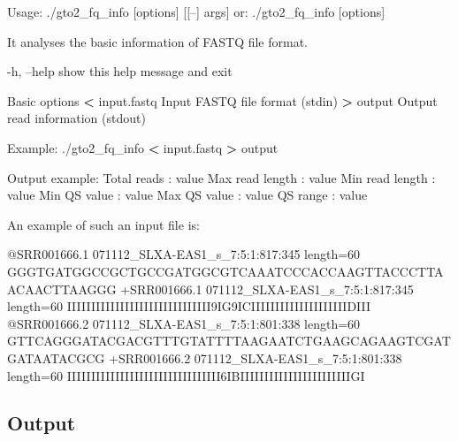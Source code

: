 \documentclass[11pt,]{krantz}
\newenvironment{Shaded}{\begin{snugshade}}{\end{snugshade}}
\newcommand{\OperatorTok}[1]{\textcolor[rgb]{0.43,0.43,0.43}{\textbf{#1}}}
\newcommand{\ExtensionTok}[1]{#1}
\newcommand{\NormalTok}[1]{#1}
\begin{document}
\begin{Shaded}
\begin{Highlighting}[]
\ExtensionTok{Usage}\NormalTok{: ./gto2_fq_info [options] [[--] args]}
   \ExtensionTok{or}\NormalTok{: ./gto2_fq_info [options]}

\ExtensionTok{It}\NormalTok{ analyses the basic information of FASTQ file format.}

    \ExtensionTok{-h}\NormalTok{, --help            show this help message and exit}

\ExtensionTok{Basic}\NormalTok{ options}
    \OperatorTok{<} \ExtensionTok{input.fastq}\NormalTok{         Input FASTQ file format (stdin)}
    \OperatorTok{>} \ExtensionTok{output}\NormalTok{              Output read information (stdout)}

\ExtensionTok{Example}\NormalTok{: ./gto2_fq_info }\OperatorTok{<}\NormalTok{ input.fastq }\OperatorTok{>}\NormalTok{ output}

\ExtensionTok{Output}\NormalTok{ example:}
\ExtensionTok{Total}\NormalTok{ reads     : value}
\ExtensionTok{Max}\NormalTok{ read length : value}
\ExtensionTok{Min}\NormalTok{ read length : value}
\ExtensionTok{Min}\NormalTok{ QS value    : value}
\ExtensionTok{Max}\NormalTok{ QS value    : value}
\ExtensionTok{QS}\NormalTok{ range        : value}
\end{Highlighting}
\end{Shaded}

An example of such an input file is:

\begin{Shaded}
\begin{Highlighting}[]
\ExtensionTok{@SRR001666.1}\NormalTok{ 071112_SLXA-EAS1_s_7:5:1:817:345 length=60}
\ExtensionTok{GGGTGATGGCCGCTGCCGATGGCGTCAAATCCCACCAAGTTACCCTTAACAACTTAAGGG}
\ExtensionTok{+SRR001666.1}\NormalTok{ 071112_SLXA-EAS1_s_7:5:1:817:345 length=60}
\ExtensionTok{IIIIIIIIIIIIIIIIIIIIIIIIIIIIII9IG9ICIIIIIIIIIIIIIIIIIIIIDIII}
\ExtensionTok{@SRR001666.2}\NormalTok{ 071112_SLXA-EAS1_s_7:5:1:801:338 length=60}
\ExtensionTok{GTTCAGGGATACGACGTTTGTATTTTAAGAATCTGAAGCAGAAGTCGATGATAATACGCG}
\ExtensionTok{+SRR001666.2}\NormalTok{ 071112_SLXA-EAS1_s_7:5:1:801:338 length=60}
\ExtensionTok{IIIIIIIIIIIIIIIIIIIIIIIIIIIIIIII6IBIIIIIIIIIIIIIIIIIIIIIIIGI}
\end{Highlighting}
\end{Shaded}

\subsection*{Output}\label{output-4}
\end{document}
